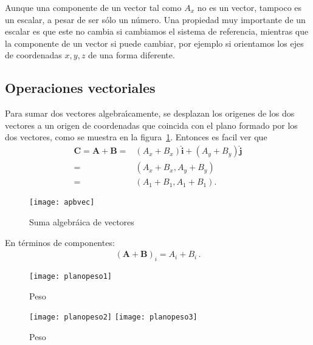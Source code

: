 \begin{frame}
Aunque una componente de un vector tal como $A_x$ no es un vector, tampoco es un escalar, a pesar de ser sólo un número. Una propiedad muy importante de un escalar es que este no cambia si cambiamos el sistema de referencia, mientras que la componente de un vector si puede cambiar, por ejemplo si orientamos los ejes de coordenadas $x, y, z$ de una forma diferente.


\subsection{Operaciones vectoriales}

Para sumar dos vectores algebra\'\i camente, se desplazan los origenes de los dos vectores a un origen de coordenadas que coincida con el plano formado por los dos vectores, como se muestra en la figura~\ref{fig:apbvec}. Entonces es facil ver que
\begin{align}
  \mathbf{C}=\mathbf{A}+\mathbf{B}=&(A_x+B_x)\hat{\mathbf{i}}+(A_y+B_y)\hat{\mathbf{j}}\nonumber\\
  =&(A_x+B_x,A_y+B_y)\nonumber\\
  =&(A_1+B_1,A_1+B_1).
\end{align}

\begin{figure}
  \centering
  \texttt{[image: apbvec]}
  \caption{Suma algebráica de vectores}
\label{fig:apbvec}
\end{figure}
En t\'erminos de componentes:
\begin{align}
  \left(\mathbf{A}+\mathbf{B}\right)_i=A_i+B_i\,.
\end{align}
\end{frame}


\begin{figure}
  \centering
  \texttt{[image: planopeso1]}
  \caption{Peso}
  \label{fig:planopeso1}
\end{figure}

\begin{figure}
  \centering
  \texttt{[image: planopeso2]} \texttt{[image: planopeso3]} 
  \caption{Peso}
  \label{fig:planopeso2}
\end{figure}

